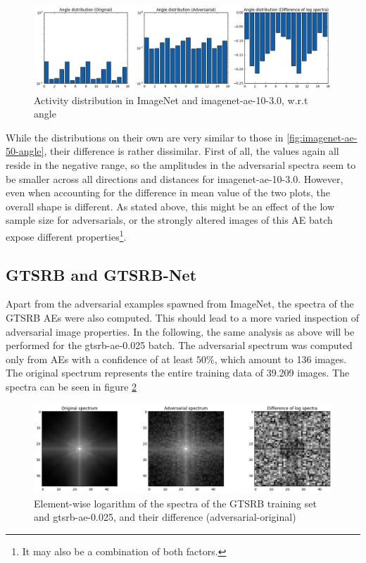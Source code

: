 \documentclass[11pt, a4paper]{article}
\begin{document}
\begin{figure}[h!tb]
	\centering
	\includegraphics[width=\textwidth]{images/spectra/imagenet-ae-10-3dot0-minconfidence-0dot9-maxorig-20000-angle-16-bins.png}
	\caption{Activity distribution in ImageNet and imagenet-ae-10-3.0, w.r.t angle}
	\label{fig:imagenet-ae-10-3dot0-angle}
\end{figure}

While the distributions on their own are very similar to those in \ref{fig:imagenet-ae-50-angle}, their difference is rather dissimilar. First of all, the values again all reside in the negative range, so the amplitudes in the adversarial spectra seem to be smaller across all directions and distances for imagenet-ae-10-3.0. However, even when accounting for the difference in mean value of the two plots, the overall shape is different. As stated above, this might be an effect of the low sample size for adversarials, or the strongly altered images of this AE batch expose different properties\footnote{It may also be a combination of both factors.}.

\subsection{GTSRB and GTSRB-Net}
Apart from the adversarial examples spawned from ImageNet, the spectra of the GTSRB AEs were also computed. This should lead to a more varied inspection of adversarial image properties. In the following, the same analysis as above will be performed for the gtsrb-ae-0.025 batch. The adversarial spectrum was computed only from AEs with a confidence of at least $50\%$, which amount to 136 images. The original spectrum represents the entire training data of 39.209 images. The spectra can be seen in figure \ref{fig:gtsrb-ae-0dot025-spectra}

\begin{figure}[h!tb]
	\centering
	\includegraphics[width=\textwidth]{images/spectra/gtsrb-ae-0dot025-minconfidence-0dot5-maxorig-0-spectra.png}
	\caption{Element-wise logarithm of the spectra of the GTSRB training set and gtsrb-ae-0.025, and their difference (adversarial-original)}
	\label{fig:gtsrb-ae-0dot025-spectra}
\end{figure}
\end{document}
